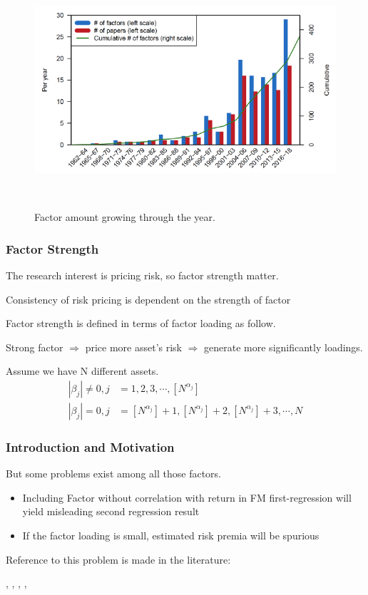 \documentclass[12pt]{beamer}
\begin{document}
\begin{frame}[plain]
	\begin{figure}
\includegraphics[scale = 0.5]{figure/factor_growth.png}
\caption{Factor amount growing through the year. }
	\cite{Harvey2017}\\
	\end{figure}
\end{frame}



\begin{frame}
	\frametitle{Factor Strength}
	The research interest is pricing risk, so factor strength matter.

	Consistency of risk pricing is dependent on the strength of factor \cite{Pesaran2019}
	
	Factor strength is defined in terms of factor loading \cite{Bailey2020} as follow.

	Strong factor $\Rightarrow$ price more asset's risk $\Rightarrow$ generate more significantly loadings.

	 Assume we have N different assets.
	\begin{align*}
	|\beta_j| \neq 0, j &= 1, 2, 3, \cdots, [N^{\alpha_j}]\\
	|\beta_j |= 0, j &= [N^{\alpha_j} ]+1 ,[N^{\alpha_j}]  +2, [N^{\alpha_j}] +3, \cdots, N
	\end{align*}
\end{frame}
\begin{frame}
\frametitle{Introduction and Motivation}
But some problems exist among all those factors.\\


\begin{itemize}
\item Including Factor without correlation with return in FM first-regression\cite{Fama1973} will yield misleading second regression result \cite{Kan1999}
\item If the factor loading is small, estimated risk premia will be spurious 
\end{itemize}

Reference to this problem is made in the literature:

, , , , 

\end{frame}
\end{document}
